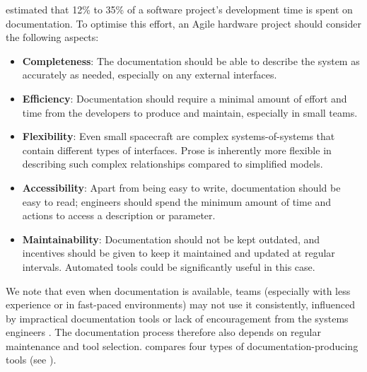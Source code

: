 \documentclass[journal,10pt]{IEEEtran}
\begin{document}
\citeauthor{sanchez-rosadoAssessingDocumentationDevelopment2009}
\autocite{sanchez-rosadoAssessingDocumentationDevelopment2009} estimated that 12\% to 35\% of a software project's development time is spent on documentation. To optimise this effort, an Agile hardware project should consider the following aspects:
 \begin{itemize}
	\item \textbf{Completeness}: The documentation should be able to describe the system as accurately as needed, especially on any external interfaces.
	\item \textbf{Efficiency}: Documentation should require a minimal amount of effort and time from the developers to produce and maintain, especially in small teams.
	\item \textbf{Flexibility}: Even small spacecraft are complex systems-of-systems that contain different types of interfaces.
	Prose is inherently more flexible in describing such complex relationships compared to simplified models.
	\item \textbf{Accessibility}: Apart from being easy to write, documentation should be easy to read; engineers should spend the minimum amount of time and actions to access a description or parameter.
	\item \textbf{Maintainability}: Documentation should not be kept outdated, and incentives should be given to keep it maintained and updated at regular intervals. Automated tools could be significantly useful in this case.
\end{itemize}

We note that even when documentation is available, teams (especially with less experience or in fast-paced environments)
	may not use it consistently, influenced by impractical documentation tools or lack of encouragement from the systems engineers \mbox{\autocite{honore-livermoreAgileSystemsEngineering2021}}.
	The documentation process therefore also depends on regular maintenance and tool selection. \mbox{} compares four types of documentation-producing tools (see \mbox{}).%
\end{document}
